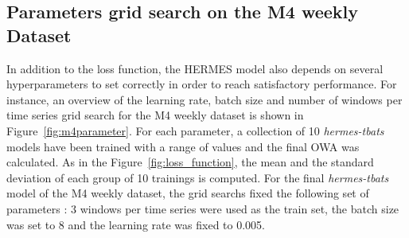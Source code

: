 \documentclass[lettersize,journal]{IEEEtran}
\begin{document}
\subsection{Parameters grid search on the M4 weekly Dataset}
\label{sec:m4gridsearch}

In addition to the loss function, the HERMES model also depends on several hyperparameters to set correctly in order to reach satisfactory performance. For instance, an overview of the learning rate, batch size and number of windows per time series grid search for the M4 weekly dataset is shown in Figure~\ref{fig:m4parameter}. For each parameter, a collection of 10 \textit{hermes-tbats} models have been trained with a range of values and the final OWA was calculated. As in the Figure~\ref{fig:loss_function}, the mean and the standard deviation of each group of 10 trainings is computed. For the final \textit{hermes-tbats} model of the M4 weekly dataset, the grid searchs fixed the following set of parameters : 3 windows per time series were used as the train set, the batch size was set to 8 and the learning rate was fixed to 0.005.
\end{document}
